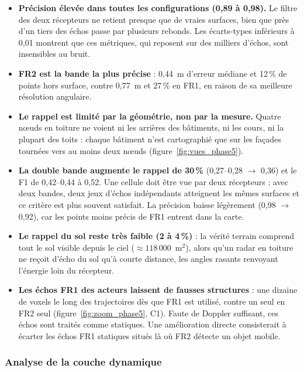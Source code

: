 \documentclass[12pt,a4paper,titlepage]{article}
\begin{document}
\begin{itemize}[leftmargin=1.5em]
    \item \textbf{Précision élevée dans toutes les configurations (0,89 à 0,98).} Le filtre des deux récepteurs ne retient presque que de vraies surfaces, bien que près d'un tiers des échos passe par plusieurs rebonds. Les écarts-types inférieurs à 0,01 montrent que ces métriques, qui reposent sur des milliers d'échos, sont insensibles au bruit.
    \item \textbf{FR2 est la bande la plus précise} : 0,44~m d'erreur médiane et 12\,\% de points hors surface, contre 0,77~m et 27\,\% en FR1, en raison de sa meilleure résolution angulaire.
    \item \textbf{Le rappel est limité par la géométrie, non par la mesure.} Quatre n\oe uds en toiture ne voient ni les arrières des bâtiments, ni les cours, ni la plupart des toits : chaque bâtiment n'est cartographié que sur les façades tournées vers au moins deux n\oe uds (figure~\ref{fig:vues_phase5}).
    \item \textbf{La double bande augmente le rappel de 30\,\%} (0,27--0,28 $\rightarrow$ 0,36) et le F1 de 0,42--0,44 à 0,52. Une cellule doit être vue par deux récepteurs ; avec deux bandes, deux jeux d'échos indépendants atteignent les mêmes surfaces et ce critère est plus souvent satisfait. La précision baisse légèrement (0,98 $\rightarrow$ 0,92), car les points moins précis de FR1 entrent dans la carte.
    \item \textbf{Le rappel du sol reste très faible (2 à 4\,\%)} : la vérité terrain comprend tout le sol visible depuis le ciel ($\approx 118\,000$~m$^2$), alors qu'un radar en toiture ne reçoit d'écho du sol qu'à courte distance, les angles rasants renvoyant l'énergie loin du récepteur.
    \item \textbf{Les échos FR1 des acteurs laissent de fausses structures} : une dizaine de voxels le long des trajectoires dès que FR1 est utilisé, contre un seul en FR2 seul (figure~\ref{fig:zoom_phase5}, C1). Faute de Doppler suffisant, ces échos sont traités comme statiques. Une amélioration directe consisterait à écarter les échos FR1 statiques situés là où FR2 détecte un objet mobile.
\end{itemize}

\subsubsection{Analyse de la couche dynamique}
\end{document}
